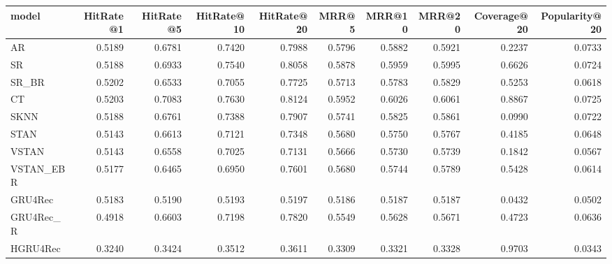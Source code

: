 \begin{tabular}{lrrrrrrrrr}
\toprule
     model &  HitRate@1 &  HitRate@5 &  HitRate@10 &  HitRate@20 &   MRR@5 &  MRR@10 &  MRR@20 &  Coverage@20 &  Popularity@20 \\
\midrule
        AR &     0.5189 &     0.6781 &      0.7420 &      0.7988 &  0.5796 &  0.5882 &  0.5921 &       0.2237 &         0.0733 \\
        SR &     0.5188 &     0.6933 &      0.7540 &      0.8058 &  0.5878 &  0.5959 &  0.5995 &       0.6626 &         0.0724 \\
     SR\_BR &     0.5202 &     0.6533 &      0.7055 &      0.7725 &  0.5713 &  0.5783 &  0.5829 &       0.5253 &         0.0618 \\
        CT &     0.5203 &     0.7083 &      0.7630 &      0.8124 &  0.5952 &  0.6026 &  0.6061 &       0.8867 &         0.0725 \\
      SKNN &     0.5188 &     0.6761 &      0.7388 &      0.7907 &  0.5741 &  0.5825 &  0.5861 &       0.0990 &         0.0722 \\
      STAN &     0.5143 &     0.6613 &      0.7121 &      0.7348 &  0.5680 &  0.5750 &  0.5767 &       0.4185 &         0.0648 \\
     VSTAN &     0.5143 &     0.6558 &      0.7025 &      0.7131 &  0.5666 &  0.5730 &  0.5739 &       0.1842 &         0.0567 \\
 VSTAN\_EBR &     0.5177 &     0.6465 &      0.6950 &      0.7601 &  0.5680 &  0.5744 &  0.5789 &       0.5428 &         0.0614 \\
   GRU4Rec &     0.5183 &     0.5190 &      0.5193 &      0.5197 &  0.5186 &  0.5187 &  0.5187 &       0.0432 &         0.0502 \\
 GRU4Rec\_R &     0.4918 &     0.6603 &      0.7198 &      0.7820 &  0.5549 &  0.5628 &  0.5671 &       0.4723 &         0.0636 \\
  HGRU4Rec &     0.3240 &     0.3424 &      0.3512 &      0.3611 &  0.3309 &  0.3321 &  0.3328 &       0.9703 &         0.0343 \\
\bottomrule
\end{tabular}
